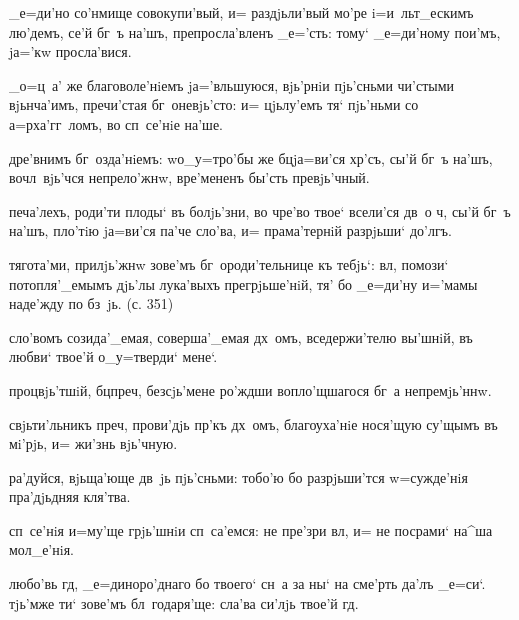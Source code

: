 


_е=ди'но со'нмище совокупи'вый, и= раздjьли'вый мо'ре 
i=и~льт_ескимъ лю'демъ, се'й бг~ъ на'шъ, препросла'вленъ 
_е='сть: тому` _е=ди'ному пои'мъ, jа='кw просла'вися.

_о=ц~а' же благоволе'нiемъ jа='вльшуюся, вjь'рнiи 
пjь'сньми чи'стыми вjьнча'имъ, пречи'стая бг~оневjь'сто: 
и= цjьлу'емъ тя` пjь'ньми со а=рха'гг~ломъ, во сп~се'нiе 
на'ше.

дре'внимъ бг~озда'нiемъ: w\т о_у=тро'бы же бц jа=ви'ся 
хр'съ, сы'й бг~ъ на'шъ, вочл~вjь'чся непрело'жнw, 
вре'мененъ бы'сть превjь'чный.

печа'лехъ, роди'ти плоды` въ болjь'зни, во чре'во твое` 
всели'ся дв~о ч, сы'й бг~ъ на'шъ, пло'тiю jа=ви'ся 
па'че сло'ва, и= прама'тернiй разрjьши` до'лгъ.

тягота'ми, прилjь'жнw зове'мъ бг~ороди'тельнице къ 
тебjь`: вл, помози` потопля'_емымъ дjь'лы лука'выхъ 
прегрjьше'нiй, тя' бо _е=ди'ну и='мамы наде'жду по бз~jь. 
(с. 351)


сло'вомъ созида'_емая, соверша'_емая дх~омъ, 
вседержи'телю вы'шнiй, въ любви` твое'й о_у=тверди` 
мене`.

процвjь'тшiй, бц преч, без\ъ сjь'мене ро'ждши 
вопло'щшагося бг~а непремjь'ннw.

свjьти'льникъ преч, прови'дjь пр'къ дх~омъ, 
благоуха'нiе нося'щую су'щымъ въ мi'рjь, и= жи'знь 
вjь'чную.

ра'дуйся, вjьща'юще дв~jь пjь'сньми: тобо'ю бо 
разрjьши'тся w=сужде'нiя пра'дjьдняя кля'тва.

сп~се'нiя и=му'ще грjь'шнiи сп~са'емся: не пре'зри 
вл, и= не посрами` на^ша мол_е'нiя.


любо'вь гд, _е=диноро'днаго бо твоего` сн~а за ны` на 
сме'рть да'лъ _е=си`. тjь'мже ти` зове'мъ бл~годаря'ще: 
сла'ва си'лjь твое'й гд.

